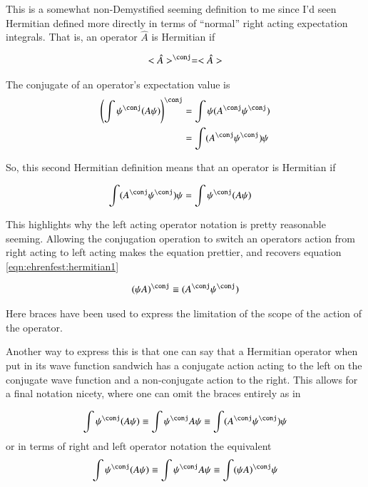 This is a somewhat non-Demystified seeming definition to me since I'd seen
Hermitian defined more directly in terms of ``normal'' right acting 
expectation integrals.  That is, an operator $\hat{A}$ is Hermitian if

\begin{align*}
<\hat{A}>^\conj = <\hat{A}>
\end{align*}

The conjugate of an operator's expectation value is
\begin{align*}
\left(\int \psi^\conj (A \psi)\right)^\conj 
&= \int \psi (A^\conj \psi^\conj) \\
&= \int (A^\conj \psi^\conj) \psi \\
\end{align*}

So, this second Hermitian definition means that an operator is Hermitian if

\begin{align*}
\int (A^\conj \psi^\conj) \psi &= \int \psi^\conj (A \psi)
\end{align*}

This highlights why the left acting operator notation is pretty reasonable
seeming.  Allowing the conjugation operation to switch an operators action
from right acting to left acting makes the equation prettier, and 
recovers equation \ref{eqn:ehrenfest:hermitian1}

\begin{align*}
(\psi A)^\conj \equiv (A^\conj \psi^\conj) 
\end{align*}

Here braces have been used to express the limitation of the scope of the action of the operator.

Another way to express this is that one can say that a Hermitian operator when put 
in its wave function sandwich has a 
conjugate action acting to the left on the conjugate wave function and a non-conjugate
action to the right.  This allows for a final notation nicety, where one can omit the 
braces entirely as in

\begin{align*}
\int \psi^\conj (A \psi) \equiv \int \psi^\conj A \psi \equiv \int (A^\conj \psi^\conj) \psi
\end{align*}
or in terms of right and left operator notation the equivalent
\begin{align*}
\int \psi^\conj (A \psi) \equiv \int \psi^\conj A \psi \equiv \int (\psi A)^\conj \psi
\end{align*}

